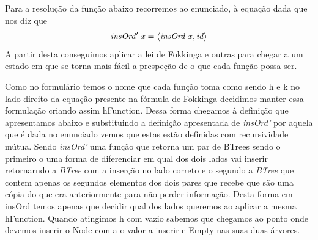 \documentclass[a4paper]{article}
\newcommand{\Varid}[1]{\mathit{#1}}
\begin{document}
Para a resolução da função abaixo recorremos ao enunciado, à equação dada que nos diz que \begin{eqnarray*} \ensuremath{\Varid{insOrd'}\;\Varid{x}\mathrel{=}\conj{\Varid{insOrd}\;\Varid{x}}{\Varid{id}}} \end{eqnarray*} A partir desta conseguimos aplicar a lei de Fokkinga e outras para chegar a um estado em que se torna mais fácil a prespeção de o que cada função possa ser.

Como no formulário temos o nome que cada função toma como sendo h e k no lado direito da equação presente na fórmula de Fokkinga decidimos manter essa formulação criando assim hFunction.
Dessa forma chegamos à definição que apresentamos abaixo e substituindo a definição apresentada de \textit{insOrd'} por aquela que é dada no enunciado vemos que estas estão definidas com recursividade mútua.
Sendo \textit{insOrd'} uma função que retorna um par de BTrees sendo o primeiro o uma forma de diferenciar em qual dos dois lados vai inserir retornarndo a \textit{BTree} com a inserção no lado correto e o segundo a \textit{BTree} que contem apenas os segundos elementos dos dois pares que recebe que são uma cópia do que era anteriormente para não perder informação.
Desta forma em insOrd temos apenas que decidir qual dos lados queremos ao aplicar a mesma hFunction.
Quando atingimos h com vazio sabemos que chegamos ao ponto onde devemos inserir o Node com a o valor a inserir e Empty nas suas duas árvores.
\end{document}
